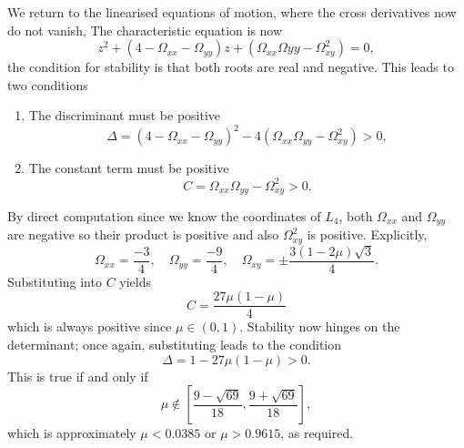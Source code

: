 \documentclass{article}
\begin{document}
We return to the linearised equations of motion, where the cross derivatives now do not vanish, The characteristic equation is now
\[ z^2 + (4 - \Omega_{xx} - \Omega_{yy})z + (\Omega_{xx}\Omega{yy} - \Omega^2_{xy}) = 0, \]
the condition for stability is that both roots are real and negative. This leads to two conditions
\begin{enumerate}
    \item The discriminant must be positive
    \[ \Delta = (4 - \Omega_{xx} - \Omega_{yy})^2 - 4(\Omega_{xx}\Omega_{yy} - \Omega^2_{xy}) > 0, \]
    \item The constant term must be positive
    \[ C = \Omega_{xx}\Omega_{yy} - \Omega^2_{xy} > 0. \]
\end{enumerate}
By direct computation since we know the coordinates of \(L_4\), both \(\Omega_{xx}\) and \(\Omega_{yy}\) are negative so their product is positive and also \(\Omega^2_{xy}\) is positive. Explicitly,
\[ \Omega_{xx} = \frac{-3}{4}, \quad \Omega_{yy} = \frac{-9}{4}, \quad \Omega_{xy} = \pm \frac{3(1-2\mu)\sqrt{3}}{4}. \]
Substituting into \(C\) yields
\[ C = \frac{27\mu(1 - \mu)}{4} \]
which is always positive since \(\mu \in (0,1)\). Stability now hinges on the determinant; once again, substituting leads to the condition
\[ \Delta = 1 - 27\mu(1-\mu) > 0. \]
This is true if and only if 
\[ \mu \notin \left[\frac{9-\sqrt{69}}{18}, \frac{9+\sqrt{69}}{18}\right], \]
which is approximately \(\mu < 0.0385\) or \(\mu > 0.9615\), as required.
\end{document}
